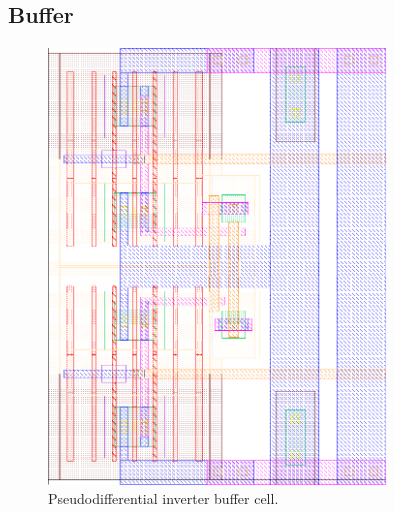 		\subsection{Buffer}
			\begin{figure}[htb!]
			        \centering
			        \includegraphics[width=0.8\textwidth, angle=0]{./figs/layout/layout_buffer}
			    \caption{Pseudodifferential inverter buffer cell.}
			\end{figure}
		\FloatBarrier\pagebreak
